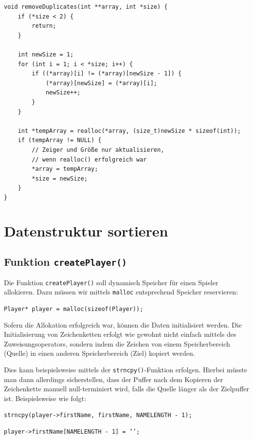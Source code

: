 \begin{verbatim}
void removeDuplicates(int **array, int *size) {
    if (*size < 2) {
        return;
    }

    int newSize = 1;
    for (int i = 1; i < *size; i++) {
        if ((*array)[i] != (*array)[newSize - 1]) {
            (*array)[newSize] = (*array)[i];
            newSize++;
        }
    }

    int *tempArray = realloc(*array, (size_t)newSize * sizeof(int));
    if (tempArray != NULL) {
        // Zeiger und Größe nur aktualisieren,
        // wenn realloc() erfolgreich war
        *array = tempArray;
        *size = newSize;
    }
}
\end{verbatim}







\chapter{Datenstruktur sortieren}

\section*{Funktion \texttt{createPlayer()}}

Die Funktion \texttt{createPlayer()} soll dynamisch Speicher für einen
Spieler allokieren. Dazu müssen wir mittels \texttt{malloc} entsprechend
Speicher reservieren:

\noindent\texttt{Player* player = malloc(sizeof(Player));}

Sofern die Allokation erfolgreich war, können die Daten initialisiert werden.
Die Initialisierung von Zeichenketten erfolgt wie gewohnt nicht einfach mittels
des Zuweisungsoperators, sondern indem die Zeichen von einem Speicherbereich
(Quelle) in einen anderen Speicherbereich (Ziel) kopiert werden.

Dies kann beispielsweise mittels der \texttt{strncpy()}-Funktion
erfolgen. Hierbei müsste man dann allerdings sicherstellen, dass der Puffer nach
dem Kopieren der Zeichenkette manuell null-terminiert wird, falls die Quelle
länger als der Zielpuffer ist. Beispielsweise wie folgt:

\noindent\texttt{strncpy(player->firstName, firstName, NAMELENGTH - 1);}

\noindent\texttt{player->firstName[NAMELENGTH - 1] = '\0';}

